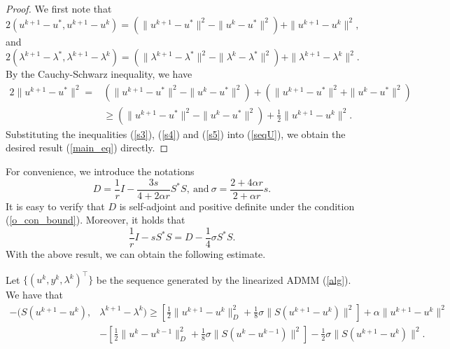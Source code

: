 \documentclass[final]{siamart171218}
\theoremstyle{remark}
\begin{document}
\begin{proof}
	We first note that
	\begin{equation}\label{s3}
	2(u^{k+1} - u^*,  u^{k+1} - u^{k})  = (\|u^{k+1}- u^*\|^2 - \|u^{k}- u^*\|^2) + \|u^{k+1} - u^k \|^2,
	\end{equation}
	and
	\begin{equation}\label{s4}
	2(\lambda^{k+1} - \lambda^*,  \lambda^{k+1} - \lambda^k)   = (\|\lambda^{k+1}- \lambda^*\|^2 - \|\lambda^k- \lambda^*\|^2) + \|\lambda^{k+1} - \lambda^k \|^2.
	\end{equation}
	By the Cauchy-Schwarz inequality, we have
	\begin{equation}\label{s5}
	 \begin{aligned}
	2\|u^{k+1} - u^*\|^2 =& (\|u^{k+1}- u^*\|^2 - \|u^{k}- u^*\|^2) + (\|u^{k+1}- u^*\|^2 + \|u^{k}- u^*\|^2) \\
	& \geq (\|u^{k+1}- u^*\|^2 - \|u^{k}- u^*\|^2) + \frac{1}{2}\|u^{k+1}- u^{k}\|^2.
	\end{aligned} \end{equation}
Substituting the inequalities (\ref{s3}), (\ref{s4}) and (\ref{s5}) into (\ref{seqU}), we obtain the desired result (\ref{main_eq}) directly.
\end{proof}

For convenience, we introduce the notations
\begin{equation}\label{def_d_sig}
D = \frac{1}{r} I - \frac{3 s}{4 + 2 \alpha r} S^*S,~\text{and}~	\sigma = \frac{2 + 4\alpha r}{2 + \alpha r} s.
\end{equation}
It is easy to verify that $D$ is self-adjoint and positive definite under the condition (\ref{o_con_bound}). Moreover, it holds that
\begin{equation}\label{s1}
\frac{1}{r}I - s S^* S =  D - \frac{1}{4} \sigma S^* S.
\end{equation}
With the above result, we can obtain the following estimate.
\begin{lemma}
	Let $\{(u^k, y^k, \lambda^k)^\top\}$ be the sequence generated by the linearized ADMM (\ref{alg}). We have that
	\begin{equation}
	\label{pTAx1}
		{\begin{aligned}
-  (S(u^{k+1}- u^{k}),&\lambda^{k+1}  - \lambda^k)
	\geq   \left[\frac{1}{2} \|u^{k+1} - u^{k}\|^2_D + \frac{1}{8}  \sigma \|S(u^{k+1} - u^{k})\|^2 \right] +  \alpha \|u^{k+1} - u^k \|^2  \\
	& - \left[ \frac{1}{2} \|u^{k} - u^{k-1}\|^2_D + \frac{1}{8} \sigma \|S(u^{k} - u^{k-1})\|^2 \right] - \frac{1}{2} \sigma  \|S(u^{k+1} - u^{k})\|^2.
	\end{aligned}}
	\end{equation}
\end{lemma}
\end{document}
